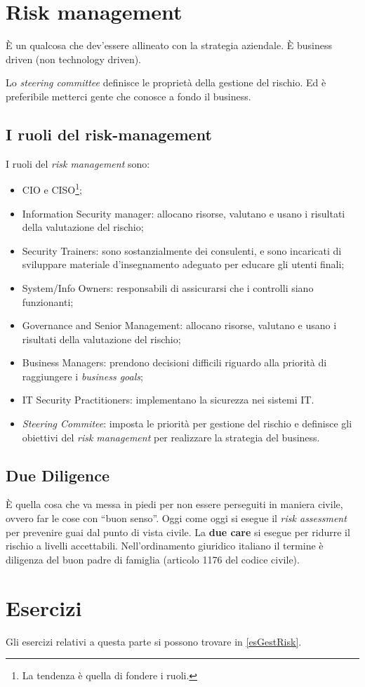 \section{Risk management}

È un qualcosa che dev'essere allineato con la strategia aziendale.
È business driven (non technology driven).

Lo \textit{steering committee} definisce le proprietà della gestione del
rischio. Ed è preferibile metterci gente che conosce a fondo il business.

\subsection{I ruoli del risk-management}

I ruoli del \textit{risk management} sono:
\begin{itemize}
\item CIO e CISO\footnote{La tendenza è quella di fondere i ruoli.};
\item Information Security manager: allocano risorse, valutano e usano i 
risultati della valutazione del rischio;
\item Security Trainers: sono sostanzialmente dei consulenti, e sono incaricati
di sviluppare materiale d'insegnamento adeguato per educare gli utenti finali;
\item System/Info Owners: responsabili di assicurarsi che i controlli siano
funzionanti;
\item Governance and Senior Management: allocano risorse, valutano e usano i
risultati della valutazione del rischio;
\item Business Managers: prendono decisioni difficili riguardo alla priorità
di raggiungere i \textit{business goals};
\item IT Security Practitioners: implementano la sicurezza nei sistemi IT.
\item \textit{Steering Commitee}: imposta le priorità per gestione del
rischio e definisce gli obiettivi del \textit{risk management} per realizzare la
strategia del business.
\end{itemize}

\subsection{Due Diligence}

È quella cosa che va messa in piedi per non essere perseguiti in maniera civile,
ovvero far le cose con ``buon senso''. Oggi come oggi si esegue il \textit{risk
assessment} per prevenire guai dal punto di vista civile. La \textbf{due care}
si esegue per ridurre il rischio a livelli accettabili. Nell'ordinamento
giuridico italiano il termine è diligenza del buon padre di famiglia (articolo
1176 del codice civile).


\section{Esercizi}

Gli esercizi relativi a questa parte si possono trovare in \ref{esGestRisk}.
